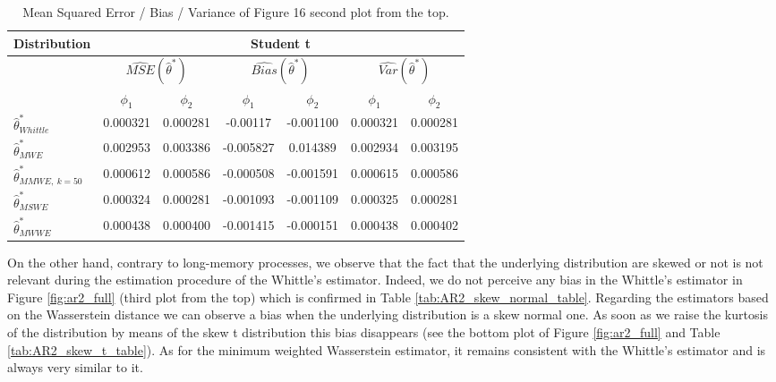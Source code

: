 \documentclass[
  11pt,
]{article}
\begin{document}
\begin{table}[h]
\centering
\begin{tabular}{|l|c|c|c|c|c|c|}
\hline
\multicolumn{1}{|c|}{\textbf{Distribution}} & \multicolumn{6}{c|}{\textbf{Student t}}                                                                                                                          \\ \hline
\textbf{}                                   & \multicolumn{2}{c|}{$\widehat{MSE}( \hat \theta^*)$} & \multicolumn{2}{c|}{$\widehat{Bias}( \hat \theta^*)$} & \multicolumn{2}{c|}{$\widehat{Var}( \hat \theta^*)$} \\ \hline
                                            & $\phi_1$                 & $\phi_2$                 & $\phi_1$                  & $\phi_2$                 & $\phi_1$                 & $\phi_2$                 \\ \hline
$\hat \theta^*_{Whittle}$                   & 0.000321                  & 0.000281                  & -0.00117                  & -0.001100                  & 0.000321                  & 0.000281                  \\ \hline
$\hat \theta^*_{MWE}$                       & 0.002953                  & 0.003386                  & -0.005827                   & 0.014389                 & 0.002934                  & 0.003195                  \\ \hline
$\hat \theta^*_{MMWE, \ k = 50}$            & 0.000612                  & 0.000586                  & -0.000508                  & -0.001591                  & 0.000615                  & 0.000586                  \\ \hline
$\hat \theta^*_{MSWE}$                      & 0.000324                  & 0.000281                  & -0.001093                  & -0.001109                  & 0.000325                  & 0.000281                  \\ \hline
$\hat \theta^*_{MWWE}$                      & 0.000438                  & 0.000400                  & -0.001415                  & -0.000151                  & 0.000438                  & 0.000402                  \\ \hline
\end{tabular}
\caption{Mean Squared Error / Bias / Variance of Figure 16 second plot from the top.}
\label{tab:AR2_Student_table}
\end{table}

On the other hand, contrary to long-memory processes, we observe that
the fact that the underlying distribution are skewed or not is not
relevant during the estimation procedure of the Whittle's estimator.
Indeed, we do not perceive any bias in the Whittle's estimator in Figure
\ref{fig:ar2_full} (third plot from the top) which is confirmed in Table
\ref{tab:AR2_skew_normal_table}. Regarding the estimators based on the
Wasserstein distance we can observe a bias when the underlying
distribution is a skew normal one. As soon as we raise the kurtosis of
the distribution by means of the skew t distribution this bias
disappears (see the bottom plot of Figure \ref{fig:ar2_full} and Table
\ref{tab:AR2_skew_t_table}). As for the minimum weighted Wasserstein
estimator, it remains consistent with the Whittle's estimator and is
always very similar to it.
\end{document}
